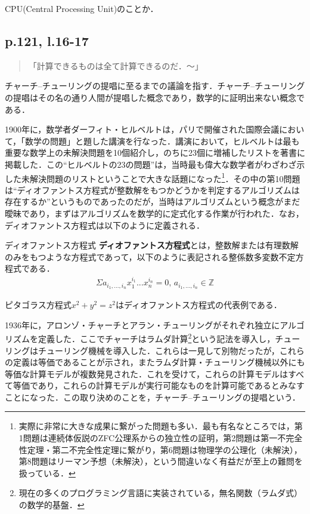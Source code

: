 \documentclass[10pt, a5paper, twoside]{ltjsarticle}
\newcommand{\hyphen}{\insertkanjiskip--\insertkanjiskip}
\begin{document}
            CPU(Central Processing Unit)のことか．

        \subsection{p.121, l.16-17}

            \begin{quote}
                「計算できるものは全て計算できるのだ．〜」
            \end{quote}

            チャーチ\hyphen チューリングの提唱に至るまでの議論を指す．チャーチ\hyphen チューリングの提唱はその名の通り人間が提唱した概念であり，数学的に証明出来ない概念である．

            1900年に，数学者ダーフィト・ヒルベルトは，パリで開催された国際会議において，「数学の問題」と題した講演を行なった．講演において，ヒルベルトは最も重要な数学上の未解決問題を10個紹介し，のちに23個に増補したリストを著書に掲載した．この“ヒルベルトの23の問題”は，当時最も偉大な数学者がわざわざ示した未解決問題のリストということで大きな話題になった\footnote{実際に非常に大きな成果に繋がった問題も多い．最も有名なところでは，第1問題は連続体仮説のZFC公理系からの独立性の証明，第2問題は第一不完全性定理・第二不完全性定理に繋がり，第6問題は物理学の公理化（未解決），第8問題はリーマン予想（未解決），という間違いなく有益だが至上の難問を扱っている．}\cite{hilbert}．その中の第10問題は“ディオファントス方程式が整数解をもつかどうかを判定するアルゴリズムは存在するか”というものであったのだが，当時はアルゴリズムという概念がまだ曖昧であり，まずはアルゴリズムを数学的に定式化する作業が行われた\cite{sipser2}．なお，ディオファントス方程式は以下のように定義される．

            \begin{dfn}{ディオファントス方程式}{}
                \textbf{ディオファントス方程式}とは，整数解または有理数解のみをもつような方程式であって，以下のように表記される整係数多変数不定方程式である．
                \begin{align*}
                    \Sigma a_{i_1,...,i_n} x_1^{i_1}...x_n^{i_n} = 0, \, a_{i_1,...,i_n} \in \mathbb{Z}
                \end{align*}
            \end{dfn}

            ピタゴラス方程式$x^2 + y^2 = z^2$はディオファントス方程式の代表例である．

            1936年に，アロンゾ・チャーチとアラン・チューリングがそれぞれ独立にアルゴリズムを定義した．ここでチャーチはラムダ計算\footnote{現在の多くのプログラミング言語に実装されている，無名関数（ラムダ式）の数学的基盤．}という記法を導入し，チューリングはチューリング機械を導入した．これらは一見して別物だったが，これらの定義は等価であることが示され，またラムダ計算・チューリング機械以外にも等価な計算モデルが複数発見された．これを受けて，これらの計算モデルはすべて等価であり，これらの計算モデルが実行可能なものを計算可能であるとみなすことになった．この取り決めのことを，チャーチ\hyphen チューリングの提唱という．
\end{document}
